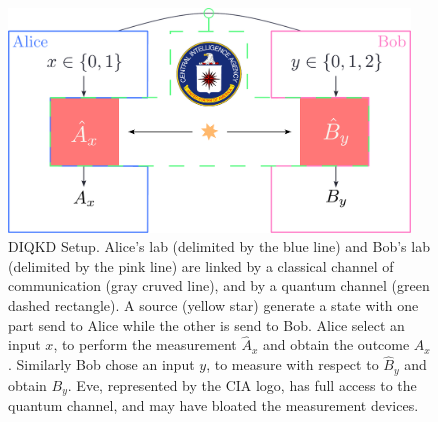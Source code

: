 \begin{figure}
	\begin{center}
		\includegraphics[width=0.95\textwidth]{chapters/deviceindependent/img/setup.pdf}
	\end{center}
	\caption{DIQKD Setup. Alice's lab (delimited by the blue line) and Bob's lab (delimited by the pink line) are linked by a classical channel of communication (gray cruved line), and by a quantum channel (green dashed rectangle). A source (yellow star) generate a state with one part send to Alice while the other is send to Bob. Alice select an input $x$, to perform the measurement $\hat{A}_x$ and obtain the outcome $A_x$. Similarly Bob chose an input $y$, to measure with respect to $\hat{B}_y$ and obtain $B_y$.
	Eve, represented by the CIA logo, has full access to the quantum channel, and may have bloated the measurement devices. }
	\label{fig:DIQKD_setup}
\end{figure}


